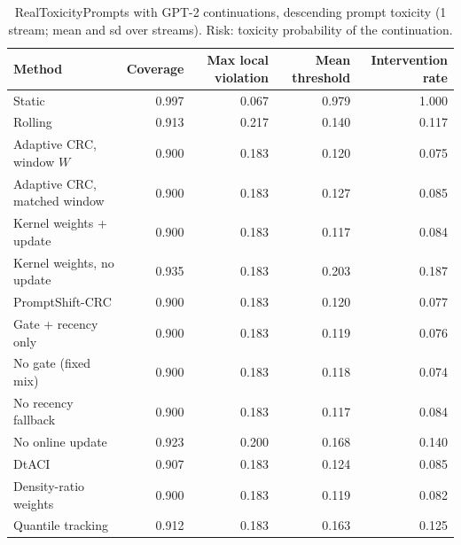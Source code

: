 \begin{table}[H]
\centering
\small
\caption{RealToxicityPrompts with GPT-2 continuations, descending prompt toxicity (1 stream; mean and sd over streams). Risk: toxicity probability of the continuation.}
\label{tab:rtp_prompt_toxicity_descending}
\begin{tabular}{lrrrr}
\toprule
Method & Coverage & Max local violation & Mean threshold & Intervention rate \\
\midrule
Static & 0.997 & 0.067 & 0.979 & 1.000 \\
Rolling & 0.913 & 0.217 & 0.140 & 0.117 \\
Adaptive CRC, window $W$ & 0.900 & 0.183 & 0.120 & 0.075 \\
Adaptive CRC, matched window & 0.900 & 0.183 & 0.127 & 0.085 \\
Kernel weights + update & 0.900 & 0.183 & 0.117 & 0.084 \\
Kernel weights, no update & 0.935 & 0.183 & 0.203 & 0.187 \\
PromptShift-CRC & 0.900 & 0.183 & 0.120 & 0.077 \\
Gate + recency only & 0.900 & 0.183 & 0.119 & 0.076 \\
No gate (fixed mix) & 0.900 & 0.183 & 0.118 & 0.074 \\
No recency fallback & 0.900 & 0.183 & 0.117 & 0.084 \\
No online update & 0.923 & 0.200 & 0.168 & 0.140 \\
DtACI & 0.907 & 0.183 & 0.124 & 0.085 \\
Density-ratio weights & 0.900 & 0.183 & 0.119 & 0.082 \\
Quantile tracking & 0.912 & 0.183 & 0.163 & 0.125 \\
\bottomrule
\end{tabular}
\end{table}


